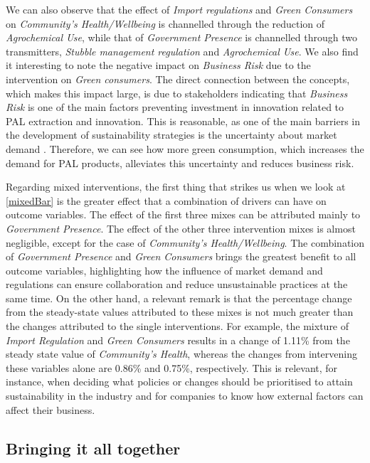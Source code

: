 We can also observe that the effect of \textit{Import regulations} and \textit{Green Consumers} on \textit{Community's Health/Wellbeing} is channelled through the reduction of \textit{Agrochemical Use}, while that of \textit{Government Presence} is channelled through two transmitters, \textit{Stubble management regulation} and \textit{Agrochemical Use}. We also find it interesting to note the negative impact on \textit{Business Risk} due to the intervention on \textit{Green consumers}. The direct connection between the concepts, which makes this impact large, is due to stakeholders indicating that \textit{Business Risk} is one of the main factors preventing investment in innovation related to PAL extraction and innovation. This is reasonable, as one of the main barriers in the development of sustainability strategies is the uncertainty about market demand \citep{chkanikova2015corporate}. Therefore, we can see how more green consumption, which increases the demand for PAL products, alleviates this uncertainty and reduces business risk. 

Regarding mixed interventions, the first thing that strikes us when we look at \cref{mixedBar} is the greater effect that a combination of drivers can have on outcome variables. The effect of the first three mixes can be attributed mainly to \textit{Government Presence}. The effect of the other three intervention mixes is almost negligible, except for the case of \textit{Community's Health/Wellbeing}. The combination of \textit{Government Presence} and \textit{Green Consumers} brings the greatest benefit to all outcome variables, highlighting how the influence of market demand and regulations can ensure collaboration and reduce unsustainable practices at the same time. On the other hand, a relevant remark is that the percentage change from the steady-state values attributed to these mixes is not much greater than the changes attributed to the single interventions. For example, the mixture of \textit{Import Regulation} and \textit{Green Consumers} results in a change of 1.11\% from the steady state value of \textit{Community's Health}, whereas the changes from intervening these variables alone are 0.86\% and 0.75\%, respectively. This is relevant, for instance, when deciding what policies or changes should be prioritised to attain sustainability in the industry and for companies to know how external factors can affect their business. 


\subsection{Bringing it all together}

